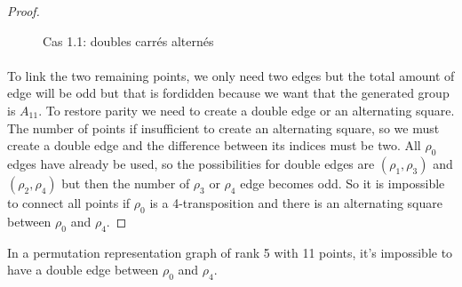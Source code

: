 \begin{proof}
\begin{figure}[H]
\begin{center}
\begin{tikzpicture}
      \end{tikzpicture}
      \caption{Cas 1.1: doubles carrés alternés}
    \end{center}
  \end{figure}

  \paragraph{}
  To link the two remaining points, we only need two edges but the total amount of edge will be odd but that is fordidden because we want that the generated group is $A_{11}$. To restore parity we need to create a double edge or an alternating square. The number of points if insufficient to create an alternating square, so we must create a double edge and the difference between its indices must be two. All $\rho_0$ edges have already be used, so the possibilities for double edges are $(\rho_1, \rho_3)$ and $(\rho_2, \rho_4)$ but then the number of $\rho_3$ or $\rho_4$ edge becomes odd. So it is impossible to connect all points if $\rho_0$ is a 4-transposition and there is an alternating square between $\rho_0$ and $\rho_4$.
\end{proof}

\begin{lemma}
  \label{lemma-forbidden-double-edge}
  In a permutation representation graph of rank 5 with 11 points, it's impossible to have a double edge between $\rho_0$ and $\rho_4$.
\end{lemma}

